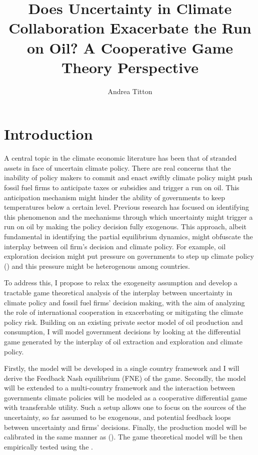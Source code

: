 \documentclass[american]{scrartcl}
\title{Does Uncertainty in Climate Collaboration Exacerbate the Run on Oil? A Cooperative Game Theory Perspective}
\author{Andrea Titton}
\newcommand{\citein}[1]{\citeauthor{#1} (\citeyear{#1})}
\begin{document}
\maketitle


\section{Introduction}

A central topic in the climate economic literature has been that of stranded assets in face of uncertain climate policy. There are real concerns that the inability of policy makers to commit and enact swiftly climate policy might push fossil fuel firms to anticipate taxes or subsidies and trigger a run on oil. This anticipation mechanism might hinder the ability of governments to keep temperatures below a certain level. Previous research has focused on identifying this phenomenon and the mechanisms through which uncertainty might trigger a run on oil by making the policy decision fully exogenous. This approach, albeit fundamental in identifying the partial equilibrium dynamics, might obfuscate the interplay between oil firm's decision and climate policy. For example, oil exploration decision might put pressure on governments to step up climate policy (\cite{Ballew2019}) and this pressure might be heterogenous among countries.

To address this, I propose to relax the exogeneity assumption and develop a tractable game theoretical analysis of the interplay between uncertainty in climate policy and fossil fuel firms' decision making, with the aim of analyzing the role of international cooperation in exacerbating or mitigating the climate policy risk. Building on an existing private sector model of oil production and consumption, I will model government decisions by looking at the differential game generated by the interplay of oil extraction and exploration and climate policy.

Firstly, the model will be developed in a single country framework and I will derive the Feedback Nash equilibrium (FNE) of the game. Secondly, the model will be extended to a multi-country framework and the interaction between governments climate policies will be modeled as a cooperative differential game with transferable utility. Such a setup allows one to focus on the sources of the uncertainty, so far assumed to be exogenous, and potential feedback loops between uncertainty and firms' decisions. Finally, the production model will be calibrated in the same manner as \citein{Barnett2019}. The game theoretical model will be then empirically tested using the \citeauthor{Burck2020}.
\end{document}
